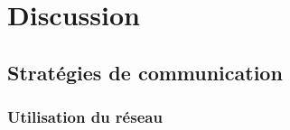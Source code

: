 \section{Discussion}

    \subsection{Stratégies de communication}

        \subsubsection{Utilisation du réseau}

